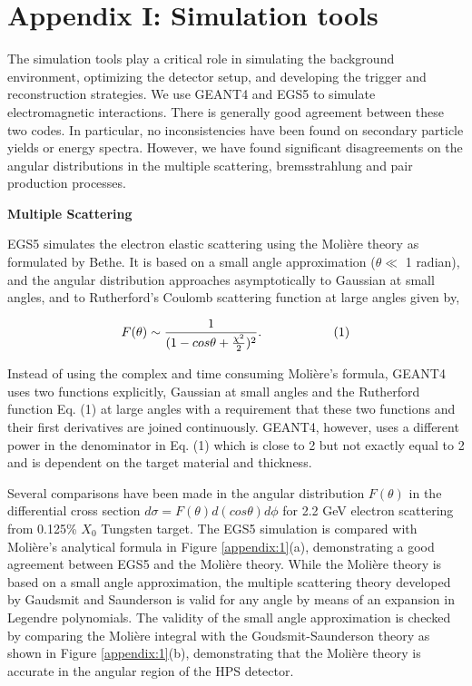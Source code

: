 \section{Appendix I: Simulation tools}

The simulation tools play a critical role in simulating the background
environment, optimizing the detector setup, and developing the trigger 
and reconstruction strategies. We use GEANT4 and EGS5 to simulate 
electromagnetic interactions. There is generally good agreement 
between these two codes. In particular, no inconsistencies have been 
found on secondary particle yields or energy spectra. However, we have found 
significant disagreements on the angular distributions in the multiple
scattering, bremsstrahlung and pair production processes.  

\vspace{1cm}
\noindent
{\bf Multiple Scattering}

EGS5 simulates the electron elastic scattering using the Moli\`{e}re theory 
\cite{moliere} as formulated by Bethe. \cite{bethe}
It is based on a small angle approximation
($\theta \ll$ 1 radian), and the angular distribution approaches asymptotically
to Gaussian at small angles, and to Rutherford's Coulomb scattering function at 
large angles given by, 

$$ F(\theta) \sim  { 1 \over {(1-cos\theta + {\chi^2 \over 2})^2}}.    \hspace{2 cm} (1) $$

Instead of using the complex and time consuming Moli\`{e}re's formula,
GEANT4 uses two functions explicitly, Gaussian at small angles and the
Rutherford function Eq. (1) at large angles with a requirement that these two
functions and their first derivatives are joined continuously. 
GEANT4, however, uses a different power
in the denominator in Eq. (1) which is close to 2 but not exactly equal to 2 and is 
dependent on the target material and thickness.

Several comparisons have been made in the angular distribution $F(\theta)$ in the
differential cross section $d\sigma=F(\theta)d(cos\theta) d\phi$ for 2.2 GeV electron
scattering from 0.125\% $X_0$ Tungsten target. 
The EGS5 simulation is compared with Moli\`{e}re's analytical formula 
in Figure \ref{appendix:1}(a), demonstrating a good agreement between EGS5 and
the Moli\`{e}re theory.
While the Moli\`{e}re theory is based on a small angle approximation,
the multiple scattering theory developed by Gaudsmit and Saunderson is valid 
for any angle by means of an expansion in Legendre polynomials. \cite{gs}
The validity of the small angle approximation is checked by comparing the 
Moli\`{e}re integral with 
the Goudsmit-Saunderson theory as shown in Figure \ref{appendix:1}(b),
demonstrating that the Moli\`{e}re theory is accurate in the angular region
of the HPS detector. 


